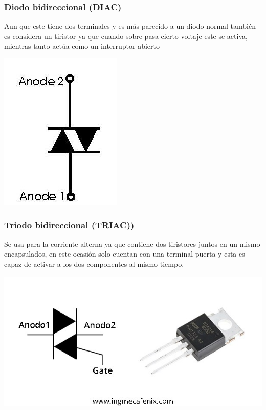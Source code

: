 \documentclass[12pt,a4paper]{article}
\begin{document}
\begin{flushleft}
\subsubsection{Diodo bidireccional (DIAC)}
Aun que este tiene dos terminales y es más parecido a un diodo normal también es considera un tiristor ya que cuando sobre pasa cierto voltaje este se activa, mientras tanto actúa como un interruptor abierto \linebreak
\begin{center}
\includegraphics[scale=0.5]{imagenes/diac.JPG} 
\end{center}
\subsubsection{Triodo bidireccional (TRIAC))}
Se usa para la corriente alterna ya que contiene dos tiristores juntos  en un mismo encapsulados, en este ocasión solo cuentan con una terminal puerta y esta es capaz de activar a los dos componentes al mismo tiempo. \linebreak
\begin{center}
\includegraphics[scale=0.5]{imagenes/triac.JPG} 
\end{center}
\end{flushleft}
\end{document}
